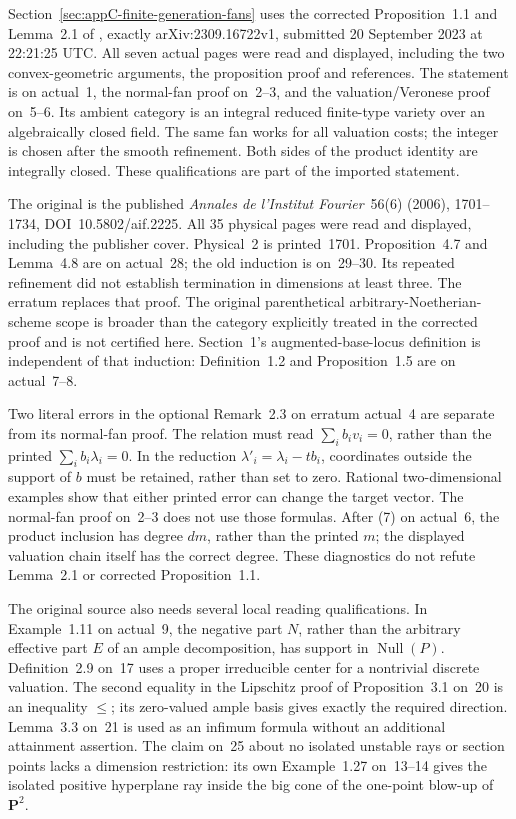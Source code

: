 Section~\ref{sec:appC-finite-generation-fans} uses the corrected
Proposition~1.1 and Lemma~2.1 of
\cite{ELMNP23BaseLocusErratumV1}, exactly
arXiv:\allowbreak 2309.16722v1, submitted 20 September 2023 at
22:21:25 UTC. All seven actual pages were read and displayed, including
the two convex-geometric arguments, the proposition proof and references.
The statement is on actual~1, the normal-fan proof on~2--3, and the
valuation/Veronese proof on~5--6. Its ambient category is an integral
reduced finite-type variety over an algebraically closed field.
The same fan works for all valuation costs; the integer is chosen after
the smooth refinement. Both sides of the product identity are integrally
closed. These qualifications are part of the imported statement.

The original \cite{ELMNP06BaseLociPublished} is the published
\emph{Annales de l'Institut Fourier}~56(6) (2006), 1701--1734,
DOI~10.5802/aif.2225. All 35 physical pages were read and displayed,
including the publisher cover. Physical~2 is printed~1701.
Proposition~4.7 and Lemma~4.8 are on actual~28; the old induction is
on~29--30. Its repeated refinement did not establish termination in
dimensions at least three. The erratum replaces that proof. The
original parenthetical arbitrary-Noetherian-scheme scope is broader
than the category explicitly treated in the corrected proof and is not
certified here. Section~1's augmented-base-locus definition is independent
of that induction: Definition~1.2 and Proposition~1.5 are on actual~7--8.

Two literal errors in the optional Remark~2.3 on erratum actual~4 are
separate from its normal-fan proof. The relation must read
$\sum_i b_i v_i=0$, rather than the printed
$\sum_i b_i\lambda_i=0$. In the reduction
$\lambda'_i=\lambda_i-tb_i$, coordinates outside the support of $b$
must be retained, rather than set to zero. Rational two-dimensional
examples show that either printed error can change the target vector.
The normal-fan proof on~2--3 does not use those formulas.
After (7) on actual~6, the product inclusion has degree $dm$,
rather than the printed $m$; the displayed valuation chain itself
has the correct degree. These diagnostics do not refute Lemma~2.1
or corrected Proposition~1.1.

The original source also needs several local reading qualifications.
In Example~1.11 on actual~9, the negative part $N$, rather than the
arbitrary effective part $E$ of an ample decomposition, has support
in $\operatorname{Null}(P)$. Definition~2.9 on~17 uses a proper
irreducible center for a nontrivial discrete valuation.
The second equality in the Lipschitz proof of Proposition~3.1 on~20
is an inequality $\leq$; its zero-valued ample basis gives exactly
the required direction. Lemma~3.3 on~21 is used as an infimum formula
without an additional attainment assertion. The claim on~25 about
no isolated unstable rays or section points lacks a dimension
restriction: its own Example~1.27 on~13--14 gives the isolated
positive hyperplane ray inside the big cone of the one-point blow-up
of $\mathbf P^2$.

